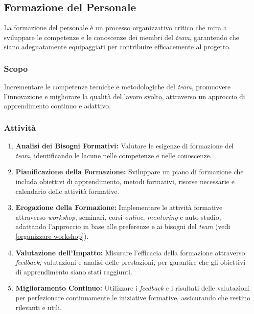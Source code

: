 \subsection{Formazione del Personale}

La formazione del personale è un processo organizzativo critico che mira a
sviluppare le competenze e le conoscenze dei membri del \textit{team}, garantendo che
siano adeguatamente equipaggiati per contribuire efficacemente al progetto.

\subsubsection{Scopo}
Incrementare le competenze tecniche e metodologiche del \textit{team}, promuovere
l'innovazione e migliorare la qualità del lavoro svolto, attraverso un approccio
di apprendimento continuo e adattivo.

\subsubsection{Attività}
\begin{enumerate}
	\item \textbf{Analisi dei Bisogni Formativi:} Valutare le esigenze di
	      formazione del \textit{team}, identificando le lacune nelle competenze e nelle
	      conoscenze.
	\item \textbf{Pianificazione della Formazione:} Sviluppare un piano di
	      formazione che includa obiettivi di apprendimento, metodi formativi,
	      risorse necessarie e calendario delle attività formative.
	\item \textbf{Erogazione della Formazione:} Implementare le attività
	      formative attraverso \textit{workshop}, seminari, corsi
	      \textit{online}, \textit{mentoring} e auto-studio, adattando
	      l'approccio in base alle preferenze e ai bisogni del \textit{team} (vedi
	      \cref{organizzare-workshop}).
	\item \textbf{Valutazione dell'Impatto:} Misurare l'efficacia della
	      formazione attraverso \textit{feedback\g}, valutazioni e analisi delle
	      prestazioni, per garantire che gli obiettivi di apprendimento siano
	      stati raggiunti.
	\item \textbf{Miglioramento Continuo:} Utilizzare i \textit{feedback\g} e i
	      risultati delle valutazioni per perfezionare continuamente le
	      iniziative formative, assicurando che restino rilevanti e utili.
\end{enumerate}

